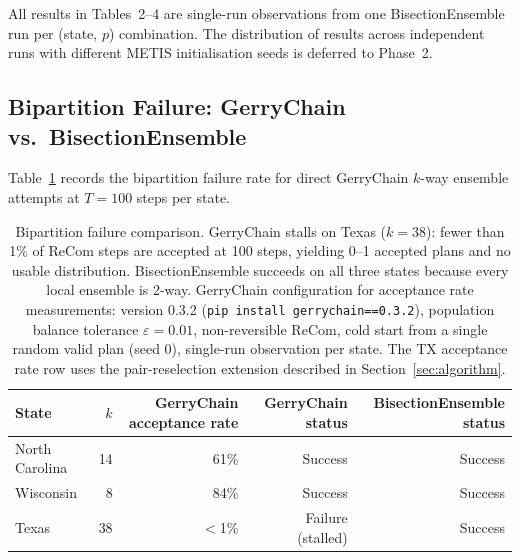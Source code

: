 All results in Tables~2--4 are single-run observations from one BisectionEnsemble
run per (state, $p$) combination. The distribution of results across independent
runs with different METIS initialisation seeds is deferred to Phase~2.

\subsection{Bipartition Failure: GerryChain vs.\ BisectionEnsemble}
\label{sec:results:failure}

Table~\ref{tab:failure} records the bipartition failure rate for direct
GerryChain $k$-way ensemble attempts at $T=100$ steps per state.

\begin{table}[h]
\centering
\begin{tabular}{lrrrr}
\toprule
State & $k$ & GerryChain acceptance rate & GerryChain status & BisectionEnsemble status \\
\midrule
North Carolina & 14 & 61\% & Success & Success \\
Wisconsin      & 8  & 84\% & Success & Success \\
Texas          & 38 & $<$1\% & Failure (stalled) & Success \\
\bottomrule
\end{tabular}
\caption{Bipartition failure comparison. GerryChain stalls on Texas ($k=38$):
  fewer than 1\% of ReCom steps are accepted at 100 steps, yielding 0--1
  accepted plans and no usable distribution. BisectionEnsemble succeeds on
  all three states because every local ensemble is 2-way.
  GerryChain configuration for acceptance rate measurements: version 0.3.2
  (\texttt{pip install gerrychain==0.3.2}), population balance tolerance
  $\varepsilon = 0.01$, non-reversible ReCom, cold start from a single
  random valid plan (seed 0), single-run observation per state. The TX
  acceptance rate row uses the pair-reselection extension described in
  Section~\ref{sec:algorithm}.}
\label{tab:failure}
\end{table}

